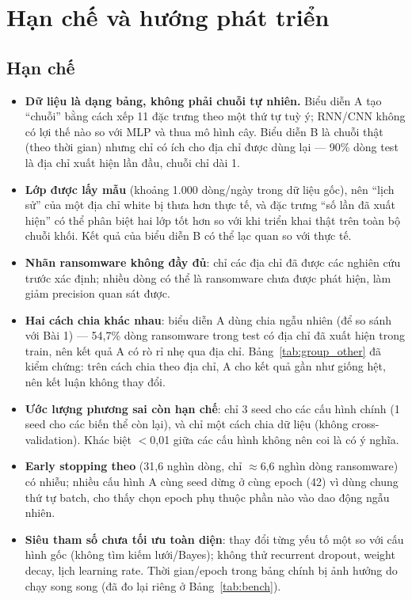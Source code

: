 \section{Hạn chế và hướng phát triển}\label{sec:limits}

\subsection{Hạn chế}
\begin{itemize}
\item \textbf{Dữ liệu là dạng bảng, không phải chuỗi tự nhiên.} Biểu diễn A tạo ``chuỗi'' bằng cách xếp 11 đặc trưng theo một thứ
  tự tuỳ ý; RNN/CNN không có lợi thế nào so với MLP và thua mô hình cây. Biểu diễn B là chuỗi thật (theo thời gian) nhưng chỉ có ích
  cho địa chỉ được dùng lại --- 90\% dòng test là địa chỉ xuất hiện lần đầu, chuỗi chỉ dài 1.
\item \textbf{Lớp  được lấy mẫu} (khoảng 1.000 dòng/ngày trong dữ liệu gốc), nên ``lịch sử'' của một địa chỉ white bị
  thưa hơn thực tế, và đặc trưng ``số lần đã xuất hiện'' có thể phân biệt hai lớp tốt hơn so với khi triển khai thật trên toàn bộ
  chuỗi khối. Kết quả của biểu diễn B có thể lạc quan so với thực tế.
\item \textbf{Nhãn ransomware không đầy đủ}: chỉ các địa chỉ đã được các nghiên cứu trước xác định; nhiều dòng  có thể là
  ransomware chưa được phát hiện, làm giảm precision quan sát được.
\item \textbf{Hai cách chia khác nhau}: biểu diễn A dùng chia ngẫu nhiên (để so sánh với Bài 1) --- 54,7\% dòng ransomware trong test
  có địa chỉ đã xuất hiện trong train, nên kết quả A có rò rỉ nhẹ qua địa chỉ. Bảng~\ref{tab:group_other} đã kiểm chứng: trên cách chia
  theo địa chỉ, A cho kết quả gần như giống hệt, nên kết luận không thay đổi.
\item \textbf{Ước lượng phương sai còn hạn chế}: chỉ 3 seed cho các cấu hình chính (1 seed cho các biến thể còn lại), và chỉ một cách
  chia dữ liệu (không cross-validation). Khác biệt $<$0,01 giữa các cấu hình không nên coi là có ý nghĩa.
\item \textbf{Early stopping theo } (31,6 nghìn dòng, chỉ $\approx$6,6 nghìn dòng ransomware) có nhiễu; nhiều cấu hình A
  cùng seed dừng ở cùng epoch (42) vì dùng chung thứ tự batch, cho thấy chọn epoch phụ thuộc phần nào vào dao động ngẫu nhiên.
\item \textbf{Siêu tham số chưa tối ưu toàn diện}: thay đổi từng yếu tố một so với cấu hình gốc (không tìm kiếm lưới/Bayes);
  không thử recurrent dropout, weight decay, lịch learning rate. Thời gian/epoch trong bảng chính bị ảnh hưởng do chạy song song
  (đã đo lại riêng ở Bảng~\ref{tab:bench}).
\end{itemize}

